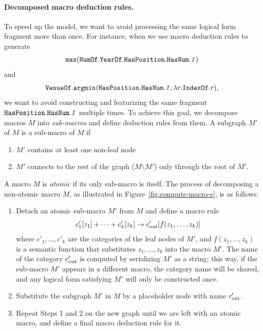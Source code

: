 \paragraph{Decomposed macro deduction rules.}
To speed up the model,
we want to avoid processing the same
logical form fragment more than once.
For instance,
when we use macro deduction rules to generate
\begin{equation}
\texttt{max}({\texttt{Num}}\texttt{Of}.{\texttt{Year}}\texttt{Of}.\texttt{Has}{\texttt{Position}}.\texttt{Has}{\texttt{Num}}.\text{\emph{1}})
\end{equation}
and
\begin{equation}
{\texttt{Venue}}\texttt{Of}.\texttt{argmin}(\texttt{Has}{\texttt{Position}}.\texttt{Has}{\texttt{Num}}.\text{\emph{1}},
\lambda r.{\texttt{Index}}\texttt{Of}.r),
\end{equation}
we want to avoid constructing and featurizing
the same fragment $\texttt{Has}{\texttt{Position}}.\texttt{Has}{\texttt{Num}}.\text{\emph{1}}$
multiple times.
%
To achieve this goal,
we decompose macros $M$ into \emph{sub-macros}
and define deduction rules from them.
A subgraph $M'$ of $M$ is a sub-macro of $M$ if
\begin{enumerate}
\item $M'$ contains at least one non-leaf node
\item $M'$ connects to the rest of the graph ($M\setminus M'$)
only through the root of $M'$.
\end{enumerate}
A macro $M$ is \emph{atomic} if its only sub-macro is itself.
The process of decomposing a non-atomic macro $M$,
as illustrated in Figure~\ref{fig:compute-macro-c},
is as follows:
\begin{enumerate}
\item 
Detach an atomic sub-macro $M'$ from $M$
and define a macro rule
\begin{equation}
c'_1[z_1] + \dots + c'_k[z_k] \to c'_\mathrm{out}[f(z_1, \dots, z_k)]
\end{equation}
where $c'_1, \dots, c'_k$
are the categories of the leaf nodes of $M'$,
and $f(z_1, \dots, z_k)$ is a semantic function
that substitutes $z_1, \dots, z_k$ into the macro $M'$.
The name of the category $c'_\mathrm{out}$
is computed by serializing $M'$ as a string;
this way, if the sub-macro $M'$
appears in a different macro,
the category name will be shared,
and any logical form satisfying $M'$ will only be
constructed once.
\item
Substitute the subgraph $M'$ in $M$
by a placeholder node with name $c'_\mathrm{out}$.
\item
Repeat Steps 1 and 2 on the new graph
until we are left with an atomic macro,
and define a final macro deduction rule for it.
\end{enumerate}

